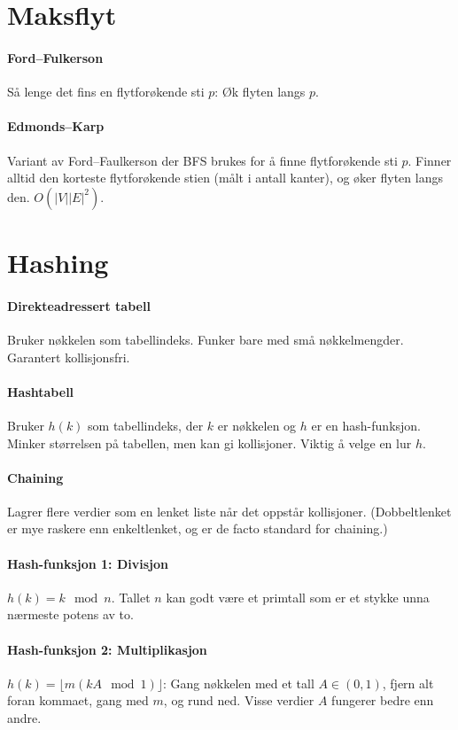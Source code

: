 \documentclass[a4paper]{article}
\begin{document}
\section{Maksflyt}
\paragraph{Ford--Fulkerson} Så lenge det fins en flytforøkende sti $p$: Øk flyten langs $p$.
\paragraph{Edmonds--Karp} Variant av Ford--Faulkerson der BFS brukes for å finne flytforøkende sti $p$. Finner alltid den korteste flytforøkende stien (målt i antall kanter), og øker flyten langs den. $O(|V||E|^2)$.



\section{Hashing}
\paragraph{Direkteadressert tabell} Bruker nøkkelen som tabellindeks. Funker bare med små nøkkelmengder. Garantert kollisjonsfri.
\paragraph{Hashtabell} Bruker $h(k)$ som tabellindeks, der $k$ er nøkkelen og $h$ er en hash-funksjon. Minker størrelsen på tabellen, men kan gi kollisjoner. Viktig å velge en lur $h$.
\paragraph{Chaining} Lagrer flere verdier som en lenket liste når det oppstår kollisjoner. (Dobbeltlenket er mye raskere enn enkeltlenket, og er de facto standard for chaining.)
\paragraph{Hash-funksjon 1: Divisjon} $h(k) = k\mod n$. Tallet $n$ kan godt være et primtall som er et stykke unna nærmeste potens av to.
\paragraph{Hash-funksjon 2: Multiplikasjon} $h(k) = \lfloor m (kA \mod 1) \rfloor$: Gang nøkkelen med et tall $A \in (0, 1)$, fjern alt foran kommaet, gang med $m$, og rund ned. Visse verdier $A$ fungerer bedre enn andre.
\end{document}
